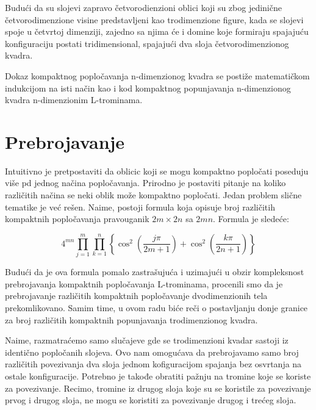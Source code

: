 Budući da su slojevi zapravo četvorodienzioni oblici koji su zbog jedinične četvorodimenzione visine predstavljeni kao trodimenzione figure, kada se slojevi spoje u četvrtoj dimenziji, zajedno sa njima će i domine koje formiraju spajajuću konfiguraciju postati tridimensional, spajajući dva sloja četvorodimenzionog kvadra.

Dokaz kompaktnog popločavanja n-dimenzionog kvadra se postiže matematičkom indukcijom na isti način kao i kod kompaktnog popunjavanja n-dimenzionog kvadra n-dimenzionim L-trominama.


\section{Prebrojavanje}


Intuitivno je pretpostaviti da oblicic koji se mogu kompaktno popločati poseduju više pd jednog načina popločavanja. Prirodno je postaviti pitanje na koliko različitih načina se neki oblik može kompaktno popločati. Jedan problem slične tematike je već rešen. Naime, postoji formula koja opisuje broj različitih kompaktnih popločavanja pravouganik $2m\times 2n$ sa $2mn$. Formula je sledeće:


    $$4^{mn} \prod_{j=1}^{m} \prod_{k=1}^{n} \left\{ \cos^2 \left( \frac{j\pi}{2m+1} \right) + \cos^2 \left( \frac{k\pi}{2n+1} \right) \right\}$$ 

Budući da je ova formula pomalo zastrašujuća i uzimajući u obzir kompleksnost prebrojavanja kompaktnih popločavanja L-trominama, procenili smo da je prebrojavanje različitih kompaktnih popločavanje dvodimenzionih tela prekomlikovano. Samim time, u ovom radu biće reči o postavljanju donje granice za broj različitih kompaktnih popunjavanja trodimenzionog kvadra. 

Naime, razmatraćemo samo slučajeve gde se trodimenzioni kvadar sastoji iz identično popločanih slojeva. Ovo nam omogućava da prebrojavamo samo broj različitih povezivanja dva sloja jednom kofiguracijom spajanja bez osvrtanja na ostale konfiguracije. Potrebno je takođe obratiti pažnju na tromine koje se koriste za povezivanje. Recimo, tromine iz drugog sloja koje su se koristile za povezivanje prvog i drugog sloja, ne mogu se koristiti za povezivanje drugog i trećeg sloja. 

